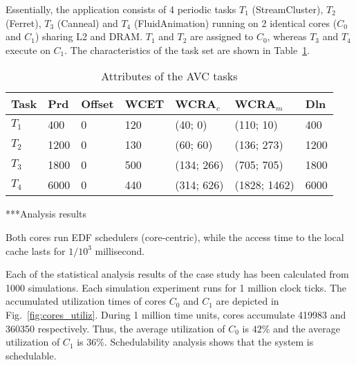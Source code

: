 Essentially, the application consists of 4 periodic tasks $T_1$ (StreamCluster), $T_2$ (Ferret), $T_3$ (Canneal) and $T_4$ (FluidAnimation) running on 2 identical cores ($C_0$ and $C_1$) sharing L2 and DRAM. $T_1$ and $T_2$ are assigned to $C_0$, whereas $T_3$ and $T_4$ execute on $C_1$. The characteristics of the task set are shown in Table~\ref{tab:taskset}.     
 \begin{table}
\centering
\caption{Attributes of the AVC tasks}
\label{tab:taskset}
\vspace{1mm}
\begin{tabular}{|l|l|l|l|l|l|l|}
\hline
Task & Prd & Offset & WCET & WCRA$_c$ & WCRA$_m$ & Dln  \\
\hline  \hline
$T_1$ & 400 & 0 & 120 & (40; 0) & (110; 10) & 400 \\
\hline 
$T_2$ & 1200 & 0 & 130 & (60; 60) & (136; 273) & 1200 \\
\hline 
$T_3$ & 1800 & 0 & 500 &(134; 266) &(705; 705) & 1800 \\
\hline 
$T_4$ & 6000 & 0 & 440 &(314; 626) &(1828; 1462) & 6000 \\
\hline
\end{tabular}
\vspace{-2mm}
\end{table}

***Analysis results

%
Both cores run EDF schedulers (core-centric), while the access time to the local cache lasts for $1/10^3$ millisecond. 


Each of the statistical analysis results of the case study has been calculated from 1000 simulations. Each simulation experiment runs for 1 million clock ticks. The accumulated utilization times of cores $C_0$ and $C_1$ are depicted in Fig.~\ref{fig:cores_utiliz}. During 1 million time units, cores accumulate 419983 and 360350 respectively. Thus, the average utilization of $C_0$ is $42\%$ and the average utilization of $C_1$ is $36\%$. Schedulability analysis shows that the system is schedulable. 

